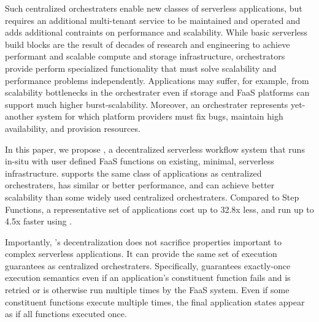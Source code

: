 Such centralized orchestraters enable new classes of serverless applications,
but requires an additional multi-tenant service to be maintained and operated
and adds additional contraints on performance and scalability.  While basic
serverless build blocks are the result of decades of research and engineering to
achieve performant and scalable compute and storage infrastructure,
orchestrators provide perform specialized functionality that must solve
scalability and performance problems independently. Applications may suffer, for
example, from scalability bottlenecks in the orchestrater even if storage and
FaaS platforms can support much higher burst-scalability. Moreover, an
orchestrater represents yet-another system for which platform providers must fix
bugs, maintain high availability, and provision resources.

In this paper, we propose \name{}, a decentralized serverless workflow system
that runs in-situ with user defined FaaS functions on existing, minimal,
serverless infrastructure. \name{} supports the same class of applications as
centralized orchestraters, has similar or better performance, and can achieve
better scalability than some widely used centralized orchestraters. Compared to
Step Functions, a representative set of applications cost up to 32.8x less, and
run up to 4.5x faster using \name{}.

Importantly, \name{}'s decentralization does not sacrifice properties important
to complex serverless applications. It can provide the same set of execution
guarantees as centralized orchestraters. Specifically, \name{} guarantees
exactly-once execution semantics even if an application's constituent function
fails and is retried or is otherwise run multiple times by the FaaS system.
Even if some constituent functions execute multiple times, the final application
states appear as if all functions executed once.



